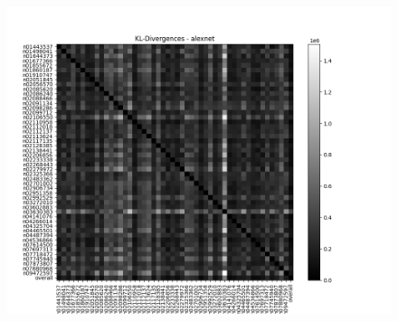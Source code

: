 \documentclass{article}
\begin{document}
    \begin{figure}[H]
        \centering
        \begin{minipage}{0.45\textwidth}
            \centering
            \includegraphics[width=\textwidth]{images/alexnet_kl_matrix_untrained_r.png} %
            

\end{minipage}
\end{figure}
\end{document}
